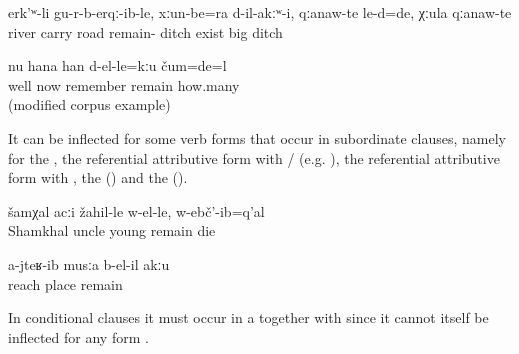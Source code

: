 \begin{exe}
	\ex	\label{ex:The river carried them away, roads had not remained, and big ditches were there}
	\gll	erk'ʷ-li	gu-r-b-erqː-ib-le,	xːun-be=ra	d-il-akːʷ-i,	qːanaw-te	le-d=de,		χːula	qːanaw-te\\
		river	carry	road	remain-		ditch	exist		big	ditch\\
	\glt	{}

	\ex	\label{ex:Now I don't remember how many (rubles) it was. (modified example)}
	\gll	nu	hana	han	d-el-le=kːu	čum=de=l\\
		well	now	remember	remain	how.many\\
	\glt	{} (modified corpus example)
\end{exe}

It can be inflected for some verb forms that occur in subordinate clauses, namely for the  , the referential attributive form with \slash{} (e.g. ), the referential attributive form with  , the   () and the  ().

\begin{exe}
	\ex	\label{ex:Uncle Shamkhal died when he was young}
	\gll	šamχal	acːi	žahil-le	w-el-le,	w-ebč'-ib=q'al\\
		Shamkhal	uncle	young	remain	die\\
	\glt	{}

	\ex	\label{ex:No place is left where I (masc.) did not go}
	\gll	a-jteʁ-ib	musːa	b-el-il	akːu\\
		reach	place	remain	\\
	\glt	{}
\end{exe}

In conditional clauses it must occur in a  together with  since it cannot itself be inflected for any  form .


